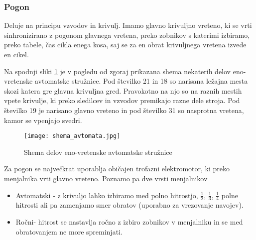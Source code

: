 \subsubsection{Pogon}
Deluje na principu vzvodov in krivulj. Imamo glavno krivuljno
vreteno, ki se vrti sinhronizirano z pogonom glavnega vretena,
preko zobnikov s katerimi izbiramo, preko tabele, čas cikla enega
kosa, saj se za en obrat krivuljnega vretena izvede en cikel.

Na spodnji sliki \ref{pogon} je v pogledu od zgoraj prikazana shema
nekaterih delov eno-vretenske avtomatske stružnice. Pod številko 21 in 18
so narisana ležajna mesta skozi katera gre glavna krivuljna gred.
Pravokotno na njo so na raznih mestih vpete krivulje, ki preko sledilcev
in vzvodov premikajo razne dele stroja. Pod številko 19 je narisano
glavno vreteno in pod številko 31 so nasprotna vretena, kamor se vpenjajo svedri.
\begin{figure}[H]
	\begin{center}
		\texttt{[image: shema\_avtomata.jpg]}
		\caption{Shema delov eno-vretenske avtomatske stružnice
			\cite{gauthier}}
		\label{pogon}
	\end{center}
\end{figure}

\noindent Za pogon se največkrat uporablja običajen trofazni elektromotor,
ki preko menjalnika vrti glavno vreteno. Poznamo pa dve vrsti
menjalnikov

\begin{itemize}
	\item Avtomatski - z krivuljo lahko izbiramo med polno
	      hitrostjo, \( \frac{1}{2} \), \( \frac{1}{3} \), \( \frac{1}{4} \)
	      polne hitrosti ali pa zamenjamo
	      smer obratov (uporabno za vrezovanje navojev).

	\item Ročni- hitrost se nastavlja ročno z izbiro zobnikov
	      v menjalniku in se med obratovanjem ne more spreminjati.
\end{itemize}
\newpage

